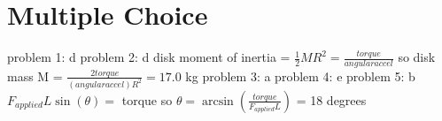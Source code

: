 \chapter{Multiple Choice}
\label{Multiple Choice}
problem 1: d 
\newline
problem 2: d
\newline
disk moment of inertia = $\frac{1}{2}MR^{2} = \frac{torque}{angular accel}$\newline
so disk mass M = $\frac{2torque}{(angular accel)R^{2}} = 17.0$ kg\newline
problem 3: a
\newline
problem 4: e
\newline
problem 5: b\newline
$F_{applied}L\sin(\theta) =$ torque\newline
so $\theta = \arcsin(\frac{torque}{F_{applied}L})$ = 18 degrees
